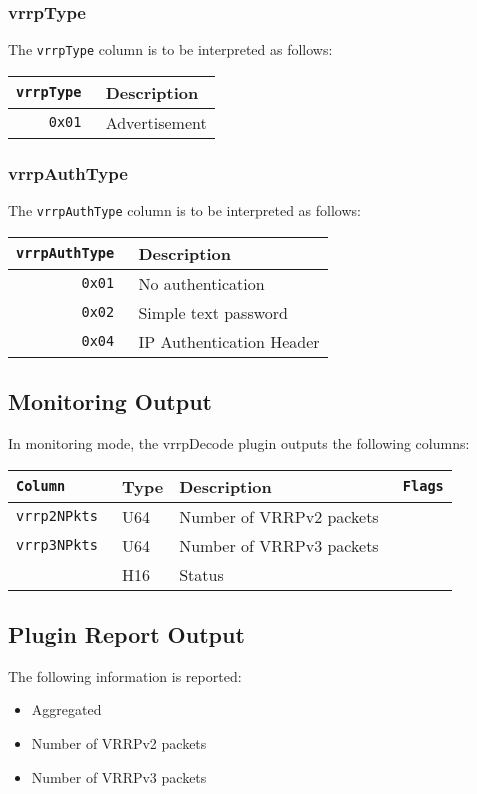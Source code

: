 \documentclass[documentation]{subfiles}
\begin{document}
\subsubsection{vrrpType}\label{vrrpType}
The {\tt vrrpType} column is to be interpreted as follows:
\begin{longtable}{>{\tt}rl}
    \toprule
    {\bf vrrpType} & {\bf Description}\\
    \midrule\endhead%
    0x01 & Advertisement\\
    \bottomrule
\end{longtable}

\subsubsection{vrrpAuthType}\label{vrrpAuthType}
The {\tt vrrpAuthType} column is to be interpreted as follows:
\begin{longtable}{>{\tt}rl}
    \toprule
    {\bf vrrpAuthType} & {\bf Description}\\
    \midrule\endhead%
    0x01 & No authentication\\
    0x02 & Simple text password\\
    0x04 & IP Authentication Header\\
    \bottomrule
\end{longtable}

\subsection{Monitoring Output}
In monitoring mode, the vrrpDecode plugin outputs the following columns:
\begin{longtable}{>{\tt}lll>{\tt\small}l}
    \toprule
    {\bf Column} & {\bf Type} & {\bf Description} & {\bf Flags}\\
    \midrule\endhead%
    vrrp2NPkts         & U64 & Number of VRRPv2 packets & \\
    vrrp3NPkts         & U64 & Number of VRRPv3 packets & \\
    \nameref{vrrpStat} & H16 & Status                   & \\
    \bottomrule
\end{longtable}

\subsection{Plugin Report Output}
The following information is reported:
\begin{itemize}
    \item Aggregated {\tt{}}
    \item Number of VRRPv2 packets
    \item Number of VRRPv3 packets
\end{itemize}
\end{document}
